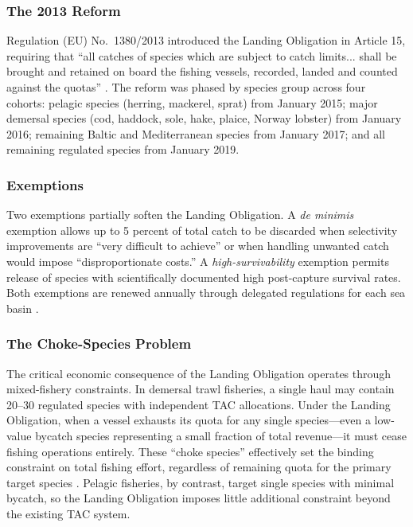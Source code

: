 \documentclass[12pt]{article}
\begin{document}
\subsubsection*{The 2013 Reform} Regulation (EU) No.\ 1380/2013 introduced the Landing Obligation in Article 15, requiring that ``all catches of species which are subject to catch limits... shall be brought and retained on board the fishing vessels, recorded, landed and counted against the quotas'' \citep{eu2013cfp}. The reform was phased by species group across four cohorts: pelagic species (herring, mackerel, sprat) from January 2015; major demersal species (cod, haddock, sole, hake, plaice, Norway lobster) from January 2016; remaining Baltic and Mediterranean species from January 2017; and all remaining regulated species from January 2019.

\subsubsection*{Exemptions} Two exemptions partially soften the Landing Obligation. A \textit{de minimis} exemption allows up to 5 percent of total catch to be discarded when selectivity improvements are ``very difficult to achieve'' or when handling unwanted catch would impose ``disproportionate costs.'' A \textit{high-survivability} exemption permits release of species with scientifically documented high post-capture survival rates. Both exemptions are renewed annually through delegated regulations for each sea basin \citep{rihan2019landing}.

\subsubsection*{The Choke-Species Problem} The critical economic consequence of the Landing Obligation operates through mixed-fishery constraints. In demersal trawl fisheries, a single haul may contain 20--30 regulated species with independent TAC allocations. Under the Landing Obligation, when a vessel exhausts its quota for any single species---even a low-value bycatch species representing a small fraction of total revenue---it must cease fishing operations entirely. These ``choke species'' effectively set the binding constraint on total fishing effort, regardless of remaining quota for the primary target species \citep{baudron2019choke}. Pelagic fisheries, by contrast, target single species with minimal bycatch, so the Landing Obligation imposes little additional constraint beyond the existing TAC system.
\end{document}
